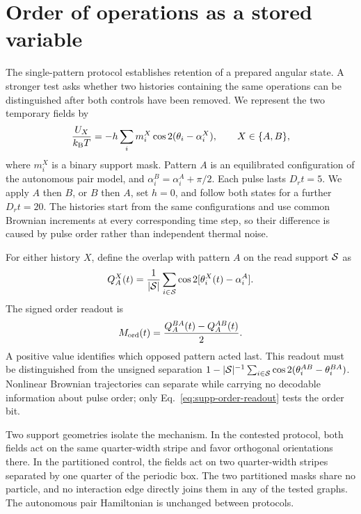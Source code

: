 \documentclass[aps,prl,onecolumn,superscriptaddress,nofootinbib]{revtex4-2}
\begin{document}
\section{Order of operations as a stored variable}

The single-pattern protocol establishes retention of a prepared angular
state.  A stronger test asks whether two histories containing the same
operations can be distinguished after both controls have been removed.  We
represent the two temporary fields by
\begin{equation}
 \frac{U_X}{k_{\rm B}T}=-h\sum_i m_i^X
 \cos2(\theta_i-\alpha_i^X),\qquad X\in\{A,B\},
 \label{eq:supp-order-fields}
\end{equation}
where \(m_i^X\) is a binary support mask.  Pattern \(A\) is an equilibrated
configuration of the autonomous pair model, and
\(\alpha_i^B=\alpha_i^A+\pi/2\).  Each pulse lasts \(D_rt=5\).  We apply
\(A\) then \(B\), or \(B\) then \(A\), set \(h=0\), and follow both states
for a further \(D_rt=20\).  The histories start from the same configurations
and use common Brownian increments at every corresponding time step, so their
difference is caused by pulse order rather than independent thermal noise.

For either history \(X\), define the overlap with pattern \(A\) on the read
support \({\cal S}\) as
\begin{equation}
 Q_A^X(t)=\frac{1}{|{\cal S}|}\sum_{i\in{\cal S}}
 \cos2[\theta_i^X(t)-\alpha_i^A].
\end{equation}
The signed order readout is
\begin{equation}
 M_{\rm ord}(t)=\frac{Q_A^{BA}(t)-Q_A^{AB}(t)}{2}.
 \label{eq:supp-order-readout}
\end{equation}
A positive value identifies which opposed pattern acted last.  This readout
must be distinguished from the unsigned separation
\(1-|{\cal S}|^{-1}\sum_{i\in{\cal S}}
\cos2(\theta_i^{AB}-\theta_i^{BA})\).  Nonlinear Brownian trajectories can
separate while carrying no decodable information about pulse order; only
Eq.~\eqref{eq:supp-order-readout} tests the order bit.

Two support geometries isolate the mechanism.  In the contested protocol,
both fields act on the same quarter-width stripe and favor orthogonal
orientations there.  In the partitioned control, the fields act on two
quarter-width stripes separated by one quarter of the periodic box.  The
two partitioned masks share no particle, and no interaction edge directly
joins them in any of the tested graphs.  The autonomous pair Hamiltonian is
unchanged between protocols.
\end{document}
